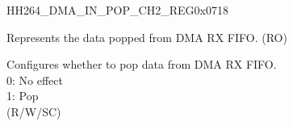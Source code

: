 \begin{register}{H}{H264\_DMA\_IN\_POP\_CH2\_REG}{0x0718}\label{regdesc:H264DMAINPOPCH2REG}
%
%
%
\regnewline%
\begin{regdesc}\begin{reglist}
\label{fielddesc:H264DMAINFIFORDATACH2}\item [H264\_DMA\_INFIFO\_RDATA\_CH2] Represents the data popped from DMA RX FIFO. (RO)
\label{fielddesc:H264DMAINFIFOPOPCH2}\item [H264\_DMA\_INFIFO\_POP\_CH2] Configures whether to pop data from DMA RX FIFO.\\
0: No effect\\
1: Pop\\ (R/W/SC)
\end{reglist}\end{regdesc}
\end{register}


